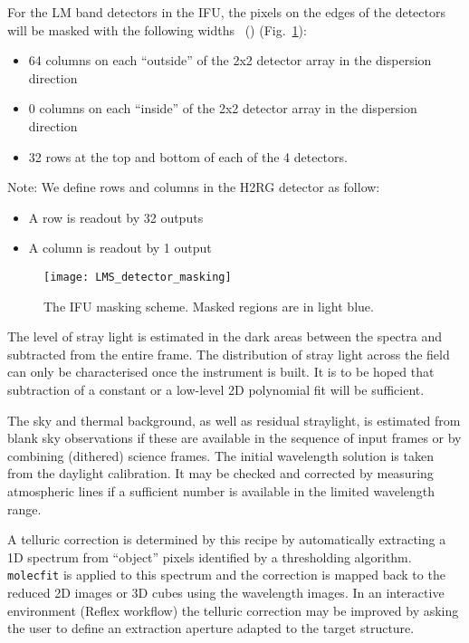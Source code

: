 For the LM band detectors in the IFU, the pixels on the edges of the detectors will be masked with the following widths~\cite{matisse_minutes} () (Fig.~\ref{fig:ifu_detector_masking}):
\begin{itemize}
\item 64 columns on each ``outside'' of the 2x2 detector array in the dispersion direction
\item 0 columns on each ``inside'' of the 2x2 detector array in the dispersion direction
\item 32 rows at the top and bottom of each of the 4 detectors.
\end{itemize}
Note: We define rows and columns in the H2RG detector as follow:
\begin{itemize}
\item A row is readout by 32 outputs
\item A column is readout by 1 output
\end{itemize}

\begin{figure}[hb]
  \centering
  \texttt{[image: LMS\_detector\_masking]}
  \caption[The IFU masking scheme]{%
    The IFU masking scheme. Masked regions are in light blue.}
  \label{fig:ifu_detector_masking}
\end{figure}



The level of stray light is estimated in the dark areas between the
spectra and subtracted from the entire frame. The distribution of
stray light across the field can only be characterised once the
instrument is built. It is to be hoped that subtraction of a constant
or a low-level 2D polynomial fit will be sufficient.

The sky and thermal background, as well as residual straylight, is
estimated from blank sky observations if these are available in the
sequence of input frames or by combining (dithered) science
frames. The initial wavelength solution is taken from the daylight
calibration. It may be checked and corrected by measuring atmospheric
lines if a sufficient number is available in the limited wavelength
range.

A telluric correction is determined by this recipe by automatically
extracting a 1D spectrum from ``object'' pixels identified by a
thresholding algorithm. \lstinline{molecfit} is applied to this
spectrum and the correction is mapped back to the reduced 2D images or
3D cubes using the wavelength images. In an interactive environment
(Reflex workflow) the telluric correction may be improved by asking
the user to define an extraction aperture adapted to the target
structure.

